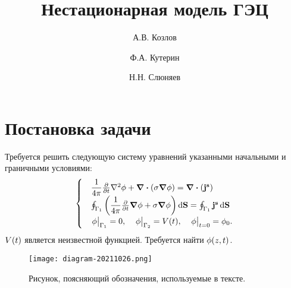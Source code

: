 \documentclass[12pt]{article}
\title{Нестационарная модель ГЭЦ}
\author{А.В. Козлов \and Ф.А. Кутерин \and Н.Н. Слюняев}
\begin{document}
	\maketitle

	\section{Постановка задачи}
	Требуется решить следующую систему уравнений указанными начальными и граничными условиями:
	\begin{equation}
		\begin{cases}\label{eq:1}
			&\dfrac1{4\pi}\pdv{t} \laplacian \phi + \div(\sigma\grad\phi) = \div(\vb{j^s})\\
			&\oint_{\Gamma_1} \qty(\dfrac1{4\pi}\pdv{t} \grad\phi + \sigma\grad\phi) \dd{\vb{S}} = \oint_{\Gamma_1} \vb{j^s}\dd{\vb{S}}\\
			&\eval{\phi}_{\Gamma_1} = 0, \quad \eval{\phi}_{\Gamma_2} = V\qty(t), \quad \eval{\phi}_{t=0} = \phi_0.
		\end{cases}
	\end{equation}
	$V\qty(t)$ является неизвестной функцией. Требуется найти $\phi\qty(z,t)$.

	\begin{figure}[htbp]
		\centering
		\texttt{[image: diagram-20211026.png]}
		\caption{Рисунок, поясняющий обозначения, используемые в тексте.}
		\label{fig:figure1}
	\end{figure}
\end{document}
